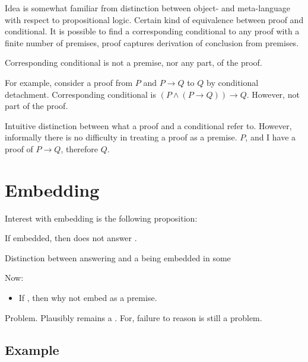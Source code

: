 \begin{note}
  Idea is somewhat familiar from distinction between object- and meta-language with respect to propositional logic.
  Certain kind of equivalence between proof and conditional.
  It is possible to find a corresponding conditional to any proof with a finite number of premises, proof captures derivation of conclusion from premises.

  Corresponding conditional is not a premise, nor any part, of the proof.

  For example, consider a proof from \(P\) and \(P \rightarrow Q\) to \(Q\) by conditional detachment.
  Corresponding conditional is \((P \land (P \rightarrow Q)) \rightarrow Q\).
  However, not part of the proof.

  Intuitive distinction between what a proof and a conditional refer to.
  However, informally there is no difficulty in treating a proof as a premise.
  \(P\), and I have a proof of \(P \rightarrow Q\), therefore \(Q\).
\end{note}


\section{Embedding }
\label{sec:wrangling}

\begin{note}
  Interest with embedding is the following proposition:

  \begin{proposition}
    If embedded, then does not answer \qWhyV{}.
  \end{proposition}

  Distinction between \ros{} answering \qWhyV{} and a \ros{} being embedded in some \ros{}

  Now:
  \begin{itemize}
  \item
    If \requ{}, then why not embed \fc{} as a premise.
  \end{itemize}
\end{note}

\begin{note}
  Problem.
  Plausibly remains a \requ{}.
  For, failure to reason is still a problem.
\end{note}

\subsection{Example}
\label{sec:example}

